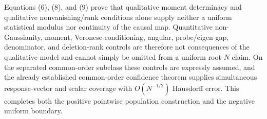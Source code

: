 Equations (6), (8), and (9) prove that qualitative moment determinacy and qualitative nonvanishing/rank conditions alone supply neither a uniform statistical modulus nor continuity of the causal map. Quantitative non-Gaussianity, moment, Veronese-conditioning, angular, probe/eigen-gap, denominator, and deletion-rank controls are therefore not consequences of the qualitative model and cannot simply be omitted from a uniform root-\(N\) claim. On the separated common-order subclass these controls are expressly assumed, and the already established common-order confidence theorem supplies simultaneous response-vector and scalar coverage with \(O(N^{-1/2})\) Hausdorff error. This completes both the positive pointwise population construction and the negative uniform boundary.